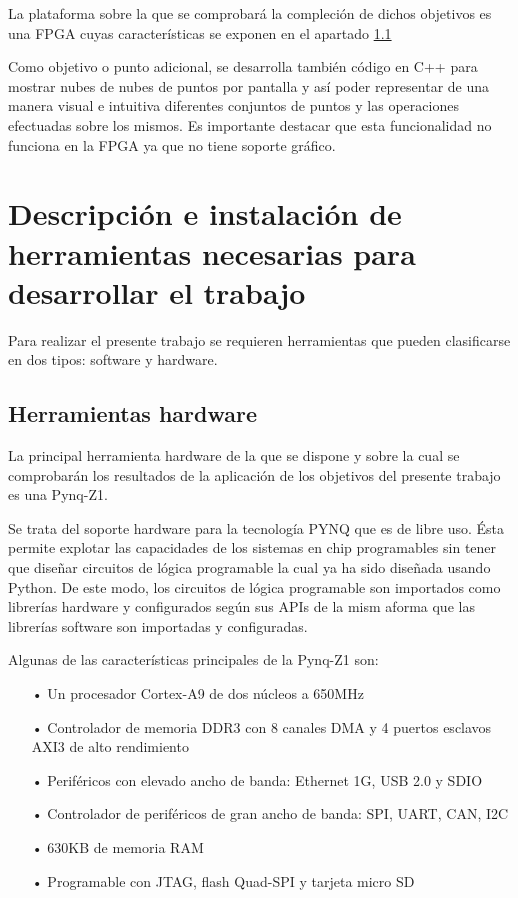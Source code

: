 La plataforma sobre la que se comprobará la compleción de dichos objetivos es una FPGA cuyas características se exponen en el apartado \ref{herraminetas_hardware}

Como objetivo o punto adicional, se desarrolla también código en C++ para mostrar nubes de nubes de puntos por pantalla y así poder representar de una manera visual e intuitiva diferentes conjuntos de puntos y las operaciones efectuadas sobre los mismos. Es importante destacar que esta funcionalidad no funciona en la FPGA ya que no tiene soporte gráfico.



\section{Descripción e instalación de herramientas necesarias para desarrollar el trabajo}
Para realizar el presente trabajo se requieren herramientas que pueden clasificarse en dos tipos: software y hardware.
\subsection{Herramientas hardware} \label{herraminetas_hardware}
La principal herramienta hardware de la que se dispone y sobre la cual se comprobarán los resultados de la aplicación de los objetivos del presente trabajo es una Pynq-Z1\cite{pynq}. 

Se trata del soporte hardware para la tecnología PYNQ que es de libre uso. Ésta permite explotar las capacidades de los sistemas en chip programables sin tener que diseñar circuitos de lógica programable la cual ya ha sido diseñada usando Python. De este modo, los circuitos de lógica programable son importados como librerías hardware y configurados según sus APIs de la mism aforma que las librerías software son importadas y configuradas.

Algunas de las características principales de la Pynq-Z1 son:

\begin{itemize}
\item[•] Un procesador Cortex-A9 de dos núcleos a 650MHz
\item[•] Controlador de memoria DDR3 con 8 canales DMA y 4 puertos esclavos AXI3 de alto rendimiento
\item[•] Periféricos con elevado ancho de banda: Ethernet 1G, USB 2.0 y SDIO 
\item[•] Controlador de periféricos de gran ancho de banda: SPI, UART, CAN, I2C
\item[•] 630KB de memoria RAM
\item[•] Programable con JTAG, flash Quad-SPI y tarjeta micro SD
\end{itemize}




